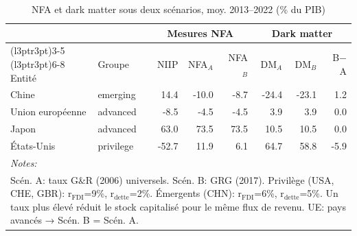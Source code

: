\documentclass[11pt]{article}
\begin{document}
\small\setcounter{table}{6}
\begin{table}[!h]
\centering
\caption{\label{tab:tab:summ_scen}NFA et dark matter sous deux scénarios, moy. 2013--2022 (\% du PIB)}
\centering
\fontsize{10.5}{12.5}\selectfont
\begin{tabular}[t]{llrrrrrr}
\toprule
\multicolumn{2}{c}{\textbf{ }} & \multicolumn{3}{c}{\textbf{Mesures NFA}} & \multicolumn{3}{c}{\textbf{Dark matter}} \\
\cmidrule(l{3pt}r{3pt}){3-5} \cmidrule(l{3pt}r{3pt}){6-8}
Entité & Groupe & NIIP & NFA$_A$ & NFA$_B$ & DM$_A$ & DM$_B$ & B$-$A\\
\midrule
Chine & emerging & 14.4 & -10.0 & -8.7 & -24.4 & -23.1 & 1.2\\
Union européenne & advanced & -8.5 & -4.5 & -4.5 & 3.9 & 3.9 & 0.0\\
Japon & advanced & 63.0 & 73.5 & 73.5 & 10.5 & 10.5 & 0.0\\
États-Unis & privilege & -52.7 & 11.9 & 6.1 & 64.7 & 58.8 & -5.9\\
\bottomrule
\multicolumn{8}{l}{\rule{0pt}{1em}\textit{\textit{Notes:} }}\\
\multicolumn{8}{l}{\rule{0pt}{1em}Scén. A: taux G\&R (2006) universels. Scén. B: GRG (2017). Privilège (USA, CHE, GBR): r$_{\text{FDI}}$=9\%, r$_{\text{dette}}$=2\%. Émergents (CHN): r$_{\text{FDI}}$=6\%, r$_{\text{dette}}$=5\%. Un taux plus élevé réduit le stock capitalisé pour le même flux de revenu. UE: pays avancés → Scén. B = Scén. A.}\\
\end{tabular}
\end{table}
\end{document}
